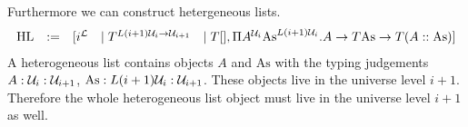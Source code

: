 Furthermore we can construct hetergeneous lists.
$$
\begin{array}{lllll}
    \text{HL} &:=&
    [
        i^{\cal L}
        &\mid
        T^{L(i+1){\cal U}_i \to {\cal U}_{i+1}}
        &\mid
        T[],
        \Pi A^{{\cal U}_i} \text{As}^{L(i+1){\cal U}_i}.
            A \to T\text{As} \to T(A :: \text{As})
    ]
\end{array}
$$
A heterogeneous list contains objects $A$ and $\text{As}$ with the typing
judgements $A : {\cal U}_i : {\cal U}_{i+1}$, $\text{As}: L(i+1){\cal U}_i : {\cal U}_{i+1}$.
These objects live in the universe level $i+1$. Therefore the whole
heterogeneous list object must live in the universe level $i+1$ as well.
